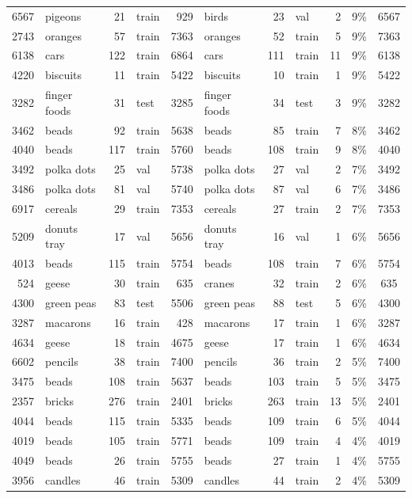 \begin{tabular}{rlrlrlrlrrc}
6567 & pigeons & 21 & train & 929 & birds & 23 & val & 2 &9\% & 6567\\
2743 & oranges & 57 & train & 7363 & oranges & 52 & train & 5 &9\% & 7363\\
6138 & cars & 122 & train & 6864 & cars & 111 & train & 11 &9\% & 6138\\
4220 & biscuits & 11 & train & 5422 & biscuits & 10 & train & 1 &9\% & 5422\\
3282 & finger foods & 31 & test & 3285 & finger foods & 34 & test & 3 &9\% & 3282\\
3462 & beads & 92 & train & 5638 & beads & 85 & train & 7 &8\% & 3462\\
4040 & beads & 117 & train & 5760 & beads & 108 & train & 9 &8\% & 4040\\
3492 & polka dots & 25 & val & 5738 & polka dots & 27 & val & 2 &7\% & 3492\\
3486 & polka dots & 81 & val & 5740 & polka dots & 87 & val & 6 &7\% & 3486\\
6917 & cereals & 29 & train & 7353 & cereals & 27 & train & 2 &7\% & 7353\\
5209 & donuts tray & 17 & val & 5656 & donuts tray & 16 & val & 1 &6\% & 5656\\
4013 & beads & 115 & train & 5754 & beads & 108 & train & 7 &6\% & 5754\\
524 & geese & 30 & train & 635 & cranes & 32 & train & 2 &6\% & 635\\
4300 & green peas & 83 & test & 5506 & green peas & 88 & test & 5 &6\% & 4300\\
3287 & macarons & 16 & train & 428 & macarons & 17 & train & 1 &6\% & 3287\\
4634 & geese & 18 & train & 4675 & geese & 17 & train & 1 &6\% & 4634\\
6602 & pencils & 38 & train & 7400 & pencils & 36 & train & 2 &5\% & 7400\\
3475 & beads & 108 & train & 5637 & beads & 103 & train & 5 &5\% & 3475\\
2357 & bricks & 276 & train & 2401 & bricks & 263 & train & 13 &5\% & 2401\\
4044 & beads & 115 & train & 5335 & beads & 109 & train & 6 &5\% & 4044\\
4019 & beads & 105 & train & 5771 & beads & 109 & train & 4 &4\% & 4019\\
4049 & beads & 26 & train & 5755 & beads & 27 & train & 1 &4\% & 5755\\
3956 & candles & 46 & train & 5309 & candles & 44 & train & 2 &4\% & 5309\\

\end{tabular}
